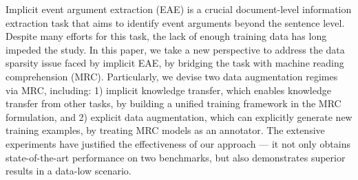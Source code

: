 Implicit event argument extraction (EAE) is a crucial document-level information extraction task that aims to identify event arguments beyond the sentence level. Despite many efforts for this task, the lack of enough training data has long impeded the study. In this paper, we take a new perspective to address the data sparsity issue faced by implicit EAE, by bridging the task with machine reading comprehension (MRC). Particularly, we devise two data augmentation regimes via MRC, including: 1) implicit knowledge transfer, which enables knowledge transfer from other tasks, by building a unified training framework in the MRC formulation, and 2) explicit data augmentation, which can explicitly generate new training examples, by treating MRC models as an annotator. The extensive experiments have justified the effectiveness of our approach --- it not only obtains state-of-the-art performance on two benchmarks, but also demonstrates superior results in a data-low scenario.

